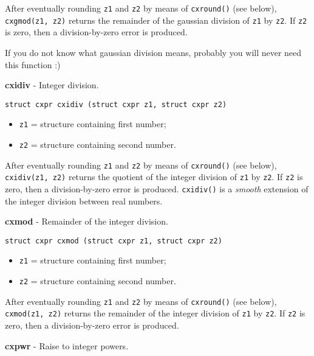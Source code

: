 \documentclass{article}
\begin{document}
After eventually rounding \texttt{z1} and \texttt{z2} by means of
\texttt{cxround()} (see below), \texttt{cxgmod(z1, z2)} returns
the remainder of the gaussian division of \texttt{z1} by \texttt{z2}.
If \texttt{z2} is zero, then a division-by-zero error is produced.

If you do not know what gaussian division means, probably
you will never need this function :)


\hrulefill{}

\textbf{cxidiv} - Integer division.

\begin{verbatim}
struct cxpr cxidiv (struct cxpr z1, struct cxpr z2)
\end{verbatim}

\begin{itemize}
\item \texttt{z1} = structure containing first number;
\item \texttt{z2} = structure containing second number.
\end{itemize}

After eventually rounding \texttt{z1} and \texttt{z2} by means of
\texttt{cxround()} (see below), \texttt{cxidiv(z1, z2)} returns
the quotient of the integer division of \texttt{z1} by \texttt{z2}.
If \texttt{z2} is zero, then a division-by-zero error is produced.
\texttt{cxidiv()} is a \textit{smooth} extension of the integer division
between real numbers.


\hrulefill{}

\textbf{cxmod} - Remainder of the integer division.

\begin{verbatim}
struct cxpr cxmod (struct cxpr z1, struct cxpr z2)
\end{verbatim}

\begin{itemize}
\item \texttt{z1} = structure containing first number;
\item \texttt{z2} = structure containing second number.
\end{itemize}

After eventually rounding \texttt{z1} and \texttt{z2} by means of
\texttt{cxround()} (see below), \texttt{cxmod(z1, z2)} returns
the remainder of the integer division of \texttt{z1} by \texttt{z2}.
If \texttt{z2} is zero, then a division-by-zero error is produced.


\hrulefill{}

\textbf{cxpwr} - Raise to integer powers.
\end{document}
